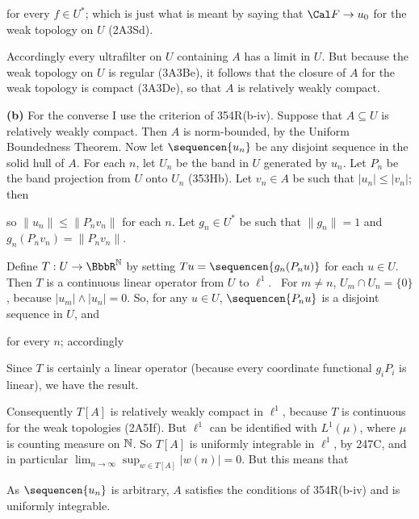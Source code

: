 {

\noindent for every $f\in U^*$;  which is just what is meant by saying
that $\Cal F\to u_0$ for the weak topology on $U$ (2A3Sd).

Accordingly every ultrafilter on $U$ containing $A$ has a limit in $U$.
But because the weak topology on $U$ is regular (3A3Be), it follows
that the closure of $A$ for the weak topology is compact (3A3De),
so that $A$ is relatively weakly compact.

\medskip

{\bf (b)} For the converse I use the criterion of 354R(b-iv).  Suppose
that $A\subseteq U$ is relatively weakly compact.   Then $A$ is
norm-bounded, by the Uniform Boundedness Theorem.   Now let
$\sequencen{u_n}$ be any disjoint sequence in the solid hull of $A$.
For each $n$, let $U_n$ be the band in $U$ generated by $u_n$.   Let
$P_n$ be the band projection from $U$ onto $U_n$ (353Hb).   Let
$v_n\in A$ be such that $|u_n|\le|v_n|$;  then


\noindent so $\|u_n\|\le\|P_nv_n\|$ for each $n$.   Let $g_n\in U^*$ be
such that $\|g_n\|=1$ and $g_n(P_nv_n)=\|P_nv_n\|$.

Define $T:U\to\BbbR^{\Bbb N}$ by setting $Tu=\sequencen{g_n(P_nu)}$ for
each $u\in U$.   Then $T$ is a continuous linear operator from $U$ to
$\ell^1$.   \Prf\ For $m\ne n$, $U_m\cap U_n=\{0\}$, because
$|u_m|\wedge|u_n|=0$.   So, for any $u\in U$, $\sequencen{P_nu}$ is a
disjoint sequence in $U$, and


\noindent for every $n$;  accordingly


\noindent Since $T$ is certainly a linear operator (because every
coordinate functional $g_iP_i$ is linear), we have the result.\ \Qed

Consequently $T[A]$ is relatively weakly compact in $\ell^1$, because
$T$ is continuous for the weak topologies (2A5If).   But $\ell^1$ can be
identified with $L^1(\mu)$, where $\mu$ is counting measure on $\Bbb N$.
So $T[A]$ is uniformly integrable in $\ell^1$, by 247C, and in
particular $\lim_{n\to\infty}\sup_{w\in T[A]}|w(n)|=0$.   But this means
that


\noindent As $\sequencen{u_n}$ is arbitrary, $A$ satisfies the
conditions of 354R(b-iv) and is uniformly integrable.
}%

